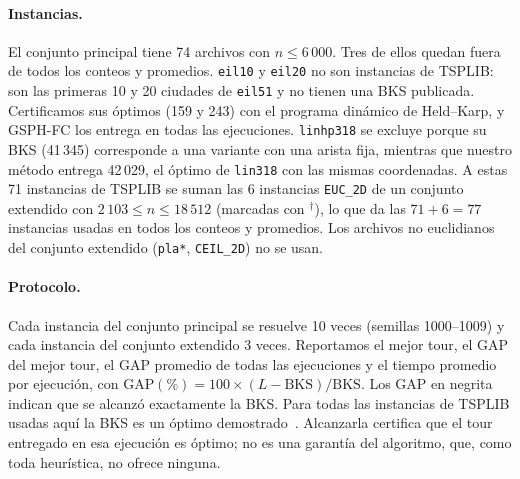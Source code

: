 \documentclass[runningheads]{llncs}
\begin{document}
\paragraph{Instancias.} El conjunto principal tiene 74 archivos con
$n\le 6\,000$. Tres de ellos quedan fuera de todos los conteos y
promedios. \texttt{eil10} y \texttt{eil20} no son instancias de TSPLIB:
son las primeras 10 y 20 ciudades de \texttt{eil51} y no tienen una BKS
publicada. Certificamos sus óptimos (159 y 243) con el programa dinámico
de Held--Karp, y GSPH-FC los entrega en todas las ejecuciones.
\texttt{linhp318} se excluye porque su BKS (41\,345) corresponde a una
variante con una arista fija, mientras que nuestro método entrega
42\,029, el óptimo de \texttt{lin318} con las mismas coordenadas. A
estas 71 instancias de TSPLIB se suman las 6 instancias
\texttt{EUC\_2D} de un conjunto extendido con $2\,103\le n\le 18\,512$
(marcadas con $^{\dagger}$), lo que da las $71+6=77$ instancias usadas
en todos los conteos y promedios. Los archivos no euclidianos del
conjunto extendido (\texttt{pla*}, \texttt{CEIL\_2D}) no se usan.

\paragraph{Protocolo.} Cada instancia del conjunto principal se resuelve
10 veces (semillas 1000--1009) y cada instancia del conjunto extendido 3
veces. Reportamos el mejor tour, el GAP del mejor tour, el GAP promedio
de todas las ejecuciones y el tiempo promedio por ejecución, con
GAP$(\%)=100\times(L-\text{BKS})/\text{BKS}$. Los GAP en negrita indican
que se alcanzó exactamente la BKS. Para todas las instancias de TSPLIB
usadas aquí la BKS es un óptimo
demostrado~\cite{reinelt1991tsplib,applegate2006tsp}. Alcanzarla
certifica que el tour entregado en esa ejecución es óptimo; no es una
garantía del algoritmo, que, como toda heurística, no ofrece ninguna.
\end{document}
